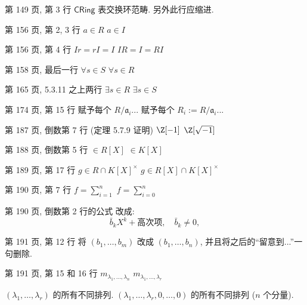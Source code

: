 \documentclass{AJerrata}
\begin{document}
\begin{Errata}
		\item[第 149 页, 第 3 行]
		$\mathsf{CRing}$ 表交换环范畴. 另外此行应缩进.
		
		\item[第 156 页, 第 2, 3 行]
		\Orig $a \in R$
		\Corr $a \in I$
		
		\item[第 156 页, 第 4 行]
		\Orig $Ir = rI = I$
		\Corr $IR = I = RI$

		\item[第 158 页, 最后一行]
		\Orig $\forall s \in S$
		\Corr $\forall s \in R$
		
		\item[第 165 页, 5.3.11 之上两行]
		\Orig $\exists s \in R$
		\Corr $\exists s \in S$
		
		\item[第 174 页, 第 15 行]
		\Orig 赋予每个 $R/\mathfrak{a}_i$...
		\Corr 赋予每个 $R_i := R/\mathfrak{a}_i$...

		\item[第 187 页, 倒数第 7 行 (定理 5.7.9 证明)]
		\Orig $\Z[-1]$
		\Corr $\Z[\sqrt{-1}]$

		\item[第 188 页, 倒数第 5 行]
		\Orig $\in R[X]$
		\Corr $\in K[X]$
		
		\item[第 189 页, 第 17 行]
		\Orig $g \in R \cap K[X]^\times$
		\Corr $g \in R[X] \cap K[X]^\times$
		
		\item[第 190 页, 第 7 行]
		\Orig $f = \sum_{i=1}^n$
		\Corr $f = \sum_{i=0}^n$
		
		\item[第 190 页, 倒数第 2 行的公式]
		改成:
		\[ \bar{b}_k X^k + \text{高次项}, \quad \bar{b}_k \neq 0, \]

		\item[第 191 页, 第 12 行]
		将 $(b_1, \ldots, b_m)$ 改成 $(b_1, \ldots, b_n)$, 并且将之后的``留意到...''一句删除.
		
		\item[第 191 页, 第 15 和 16 行]
		\Orig $m_{\lambda_1, \ldots, \lambda_n}$
		\Corr $m_{\lambda_1, \ldots, \lambda_r}$
		
		\Orig $(\lambda_1, \ldots, \lambda_r)$ 的所有不同排列.
		\Corr $(\lambda_1, \ldots, \lambda_r, 0, \ldots, 0)$ 的所有不同排列 ($n$ 个分量).
		

\end{Errata}
\end{document}
